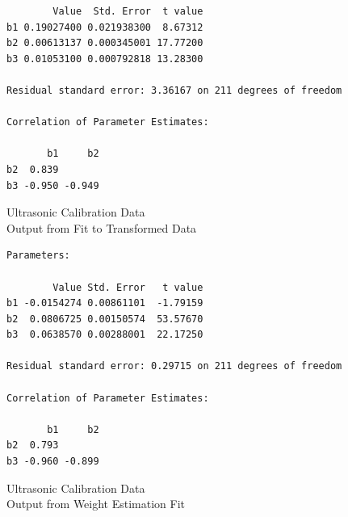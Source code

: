 {{{\begin{verbatim}
        Value  Std. Error  t value 
b1 0.19027400 0.021938300  8.67312
b2 0.00613137 0.000345001 17.77200
b3 0.01053100 0.000792818 13.28300

Residual standard error: 3.36167 on 211 degrees of freedom

Correlation of Parameter Estimates:

       b1     b2 
b2  0.839       
b3 -0.950 -0.949
\end{verbatim}
}
\clearpage
\begin{figure}
\end{figure}
\begin{figure}
\end{figure}
\begin{figure}
\end{figure}
\begin{figure}
\end{figure}
\begin{figure}
\end{figure}
\clearpage
\newpage
\begin{center}
Ultrasonic Calibration Data \\
Output from Fit to Transformed Data 
\end{center}
\vspace{0.5in}
{\large
\begin{verbatim}
Parameters:

        Value Std. Error   t value 
b1 -0.0154274 0.00861101  -1.79159
b2  0.0806725 0.00150574  53.57670
b3  0.0638570 0.00288001  22.17250

Residual standard error: 0.29715 on 211 degrees of freedom

Correlation of Parameter Estimates:

       b1     b2 
b2  0.793       
b3 -0.960 -0.899
\end{verbatim}
}
\clearpage
\begin{figure}
\end{figure}
\begin{figure}
\end{figure}
\clearpage
\newpage
\begin{center}
Ultrasonic Calibration Data \\
Output from Weight Estimation Fit
\end{center}
\vspace{0.5in}
{\large
\begin{verbatim}


\end{verbatim}}}}
